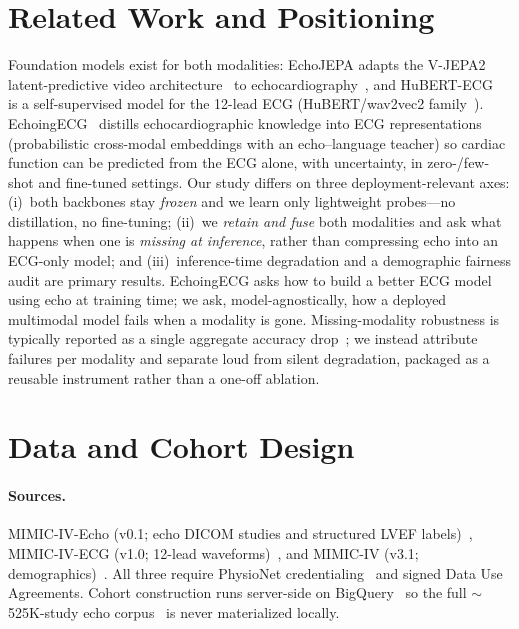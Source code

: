 \documentclass{article}
\begin{document}
\section{Related Work and Positioning}
\label{sec:related}
Foundation models exist for both modalities: EchoJEPA adapts the V-JEPA2 latent-predictive
video architecture~\citep{vjepa2} to echocardiography~\citep{echojepa}, and HuBERT-ECG~\citep{hubertecg}
is a self-supervised model for the 12-lead ECG (HuBERT/wav2vec2 family~\citep{wav2vec2}). EchoingECG~\citep{echoingecg} distills echocardiographic knowledge into ECG
representations (probabilistic cross-modal embeddings with an echo--language teacher) so cardiac
function can be predicted from the ECG alone, with uncertainty, in zero-/few-shot and fine-tuned
settings. Our study differs on three deployment-relevant axes: (i)~both backbones stay
\emph{frozen} and we learn only lightweight probes---no distillation, no fine-tuning; (ii)~we
\emph{retain and fuse} both modalities and ask what happens when one is \emph{missing at
inference}, rather than compressing echo into an ECG-only model; and (iii)~inference-time
degradation and a demographic fairness audit are primary results. EchoingECG asks how to build a
better ECG model using echo at training time; we ask, model-agnostically, how a deployed
multimodal model fails when a modality is gone. Missing-modality robustness is typically reported
as a single aggregate accuracy drop~\citep{smil2021,mmrobust2022}; we instead attribute failures per modality and separate loud
from silent degradation, packaged as a reusable instrument rather than a one-off ablation.

\section{Data and Cohort Design}
\label{sec:data}
\paragraph{Sources.} MIMIC-IV-Echo (v0.1; echo DICOM studies and structured LVEF
labels)~\citep{mimicivecho}, MIMIC-IV-ECG (v1.0; 12-lead waveforms)~\citep{mimicivecg}, and
MIMIC-IV (v3.1; demographics)~\citep{mimiciv,johnson2023mimiciv}. All three require
PhysioNet credentialing~\citep{goldberger2000} and signed Data Use Agreements. Cohort
construction runs server-side on BigQuery~\citep{mimiccloud} so the full $\sim$525K-study echo
corpus~\citep{mimicivecho} is never materialized locally.
\end{document}
